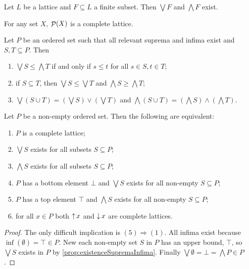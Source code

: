 \begin{lemma} \label{lemma:supInfFiniteSubsetsLattice}
Let $L$ be a lattice and $F\subseteq L$ a finite subset. Then $\bigvee F$ and $\bigwedge F$ exist. 
\end{lemma}

\begin{example}
For any set $X$, $\mathop{\mathcal{P}}(X)$ is a complete lattice.
\end{example}

\begin{lemma}
Let $P$ be an ordered set such that all relevant suprema and infima exist and $S,T\subseteq P$. Then
\begin{enumerate}
\item $\bigvee S \leq \bigwedge T$ if and only if $s\leq t$ for all $s\in S,t\in T$;
\item if $S\subseteq T$, then $\bigvee S \leq \bigvee T$ and $\bigwedge S \geq \bigwedge T$;
\item $\bigvee(S\cup T) = \left(\bigvee S\right)\vee \left(\bigvee T\right)$ and $\bigwedge(S\cup T) = \left(\bigwedge S\right)\wedge \left(\bigwedge T\right)$.
\end{enumerate}
\end{lemma}

\begin{proposition} \label{prop:completeLatticeBasic}
Let $P$ be a non-empty ordered set. Then the following are equivalent:
\begin{enumerate}
\item $P$ is a complete lattice;
\item $\bigvee S$ exists for all subsets $S\subseteq P$;
\item $\bigwedge S$ exists for all subsets $S\subseteq P$;
\item $P$ has a bottom element $\bot$ and $\bigvee S$ exists for all non-empty $S\subseteq P$;
\item $P$ has a top element $\top$ and $\bigwedge S$ exists for all non-empty $S\subseteq P$;
\item for all $x\in P$ both $\mathop{\uparrow} x$ and $\mathop{\downarrow} x$ are complete lattices.
\end{enumerate}
\end{proposition}
\begin{proof}
The only difficult implication is $(5)\Rightarrow (1)$. All infima exist because $\inf(\emptyset) = \top \in P$. New each non-empty set $S$ in $P$ has an upper bound, $\top$, so $\bigvee S$ exists in $P$ by \ref{prop:existenceSupremaInfima}. Finally $\bigvee \emptyset = \bot = \bigwedge P \in P$.
\end{proof}

